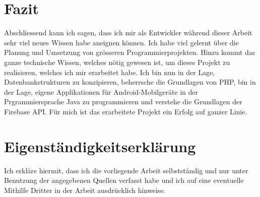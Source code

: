 \documentclass[../main.tex]{subfiles}
\begin{document}
	\section{Fazit}
	Abschliessend kann ich sagen, dass ich mir als Entwickler während dieser Arbeit sehr viel neues Wissen habe aneignen können. Ich habe viel gelernt über die Planung und Umsetzung von grösseren Programmierprojekten. Hinzu kommt das ganze technische  Wissen, welches nötig gewesen ist, um dieses Projekt zu realisieren, welches ich mir erarbeitet habe. Ich bin nun in der Lage, Datenbankstrukturen zu konzipieren, beherrsche die Grundlagen von PHP, bin in der Lage, eigene Applikationen für Android-Mobilgeräte in der Prgrammiersprache Java zu programmieren und verstehe die Grundlagen der Firebase API. Für mich ist das erarbeitete Projekt ein Erfolg auf ganzer Linie.
	
	\newpage
	\section*{Eigenständigkeitserklärung}
	Ich erkläre hiermit, dass ich die vorliegende Arbeit selbstständig und nur unter Benutzung der angegebenen Quellen verfasst habe und ich auf eine eventuelle Mithilfe Dritter in der Arbeit ausdrücklich hinweise.
	
\end{document}

